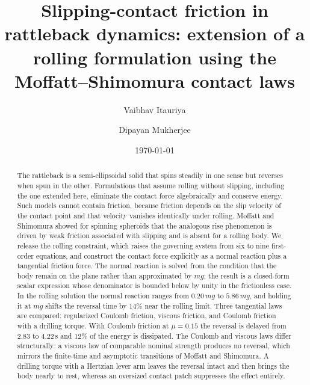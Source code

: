 \documentclass[aps,pre,twocolumn,superscriptaddress,amsmath,amssymb,floatfix,nofootinbib]{revtex4-2}
\begin{document}
\title{Slipping-contact friction in rattleback dynamics: extension of a rolling
formulation using the Moffatt--Shimomura contact laws}

\author{Vaibhav Itauriya}
\author{Dipayan Mukherjee}

\date{\today}

\begin{abstract}
The rattleback is a semi-ellipsoidal solid that spins steadily in one sense but reverses
when spun in the other. Formulations that assume rolling without slipping, including the
one extended here, eliminate the contact force algebraically and conserve energy. Such
models cannot contain friction, because friction depends on the slip velocity of the
contact point and that velocity vanishes identically under rolling. Moffatt and
Shimomura showed for spinning spheroids that the analogous rise phenomenon is driven by
weak friction associated with slipping and is absent for a rolling body. We release the
rolling constraint, which raises the governing system from six to nine first-order
equations, and construct the contact force explicitly as a normal reaction plus a
tangential friction force. The normal reaction is solved from the condition that the body
remain on the plane rather than approximated by $mg$; the result is a closed-form scalar
expression whose denominator is bounded below by unity in the frictionless case. In the
rolling solution the normal reaction ranges from $0.20\,mg$ to $5.86\,mg$, and holding it
at $mg$ shifts the reversal time by $14\%$ near the rolling limit. Three tangential laws
are compared: regularized Coulomb friction, viscous friction, and Coulomb friction with a
drilling torque. With Coulomb friction at $\mu=0.15$ the reversal is delayed from $2.83$
to $4.22$\,s and $12\%$ of the energy is dissipated. The Coulomb and viscous laws differ
structurally: a viscous law of comparable nominal strength produces no reversal, which
mirrors the finite-time and asymptotic transitions of Moffatt and Shimomura. A drilling
torque with a Hertzian lever arm leaves the reversal intact and then brings the body
nearly to rest, whereas an oversized contact patch suppresses the effect entirely.
\end{abstract}

\maketitle
\end{document}
